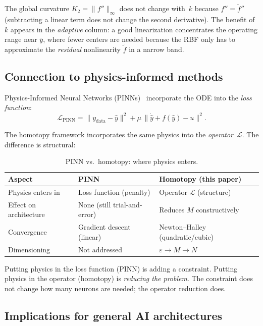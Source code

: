 \documentclass[11pt,a4paper]{article}
\begin{document}
The global curvature $K_2 = \|f''\|_\infty$ does not change with~$k$ because $f'' = \tilde{f}''$ (subtracting a linear term does not change the second derivative). The benefit of $k$ appears in the \emph{adaptive} column: a good linearization concentrates the operating range near $\bar{y}$, where fewer centers are needed because the RBF only has to approximate the \emph{residual} nonlinearity $\tilde{f}$ in a narrow band.

\subsection{Connection to physics-informed methods}

Physics-Informed Neural Networks (PINNs)~\cite{Raissi2019} incorporate the ODE into the \emph{loss function}:
\begin{equation}
\mathcal{L}_{\mathrm{PINN}} = \|y_{\mathrm{data}} - \hat{y}\|^2 + \mu\,\|\dot{\hat{y}} + f(\hat{y}) - u\|^2.
\end{equation}

The homotopy framework incorporates the same physics into the \emph{operator}~$\mathcal{L}$. The difference is structural:

\begin{table}[H]
\centering
\caption{PINN vs.\ homotopy: where physics enters.}
\label{tab:pinn-vs-ham}
\begin{tabular}{L{3.5cm} L{5cm} L{5cm}}
\toprule
\textbf{Aspect} & \textbf{PINN} & \textbf{Homotopy (this paper)} \\
\midrule
Physics enters in & Loss function (penalty) & Operator $\mathcal{L}$ (structure) \\
Effect on architecture & None (still trial-and-error) & Reduces $M$ constructively \\
Convergence & Gradient descent (linear) & Newton--Halley (quadratic/cubic) \\
Dimensioning & Not addressed & $\varepsilon \to M \to N$ \\
\bottomrule
\end{tabular}
\end{table}

Putting physics in the loss function (PINN) is adding a constraint. Putting physics in the operator (homotopy) is \emph{reducing the problem}. The constraint does not change how many neurons are needed; the operator reduction does.

\subsection{Implications for general AI architectures}
\end{document}
